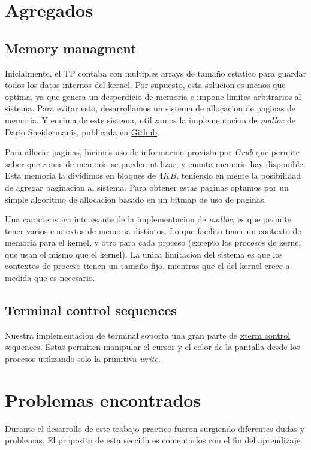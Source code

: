 \documentclass[a4paper,10pt]{article}
\begin{document}
\newpage
\section{Agregados}
\subsection{Memory managment}
Inicialmente, el TP contaba con multiples arrays de tamaño estatico para guardar todos los datos internos del kernel.
Por supuesto, esta solucion es menos que optima, ya que genera un desperdicio de memoria e impone limites arbitrarios al sistema.
Para evitar esto, desarrollamos un sistema de allocacion de paginas de memoria.
Y encima de este sistema, utilizamos la implementacion de \textit{malloc} de Dario Sneidermanis, publicada en \href{https://github.com/esneider/malloc}{Github}.

Para allocar paginas, hicimos uso de informacion provista por \textit{Grub} que permite saber que zonas de memoria se pueden utilizar, y cuanta memoria hay disponible.
Esta memoria la dividimos en bloques de $4KB$, teniendo en mente la posibilidad de agregar paginacion al sistema.
Para obtener estas paginas optamos por un simple algoritmo de allocacion basado en un bitmap de uso de paginas.

Una caracteristica interesante de la implementacion de \textit{malloc}, es que permite tener varios contextos de memoria distintos.
Lo que facilito tener un contexto de memoria para el kernel, y otro para cada proceso (excepto los procesos de kernel que usan el mismo que el kernel).
La unica limitacion del sistema es que los contextos de proceso tienen un tamaño fijo, mientras que el del kernel crece a medida que es necesario.

\subsection{Terminal control sequences}
Nuestra implementacion de terminal soporta una gran parte de \href{http://invisible-island.net/xterm/ctlseqs/ctlseqs.html}{xterm control sequences}.
Estas permiten manipular el cursor y el color de la pantalla desde los procesos utilizando solo la primitiva \textit{write}.

\newpage
\section{Problemas encontrados}

Durante el desarrollo de este trabajo practico fueron surgiendo diferentes dudas y problemas. El proposito de esta
sección es comentarlos con el fin del aprendizaje.
\end{document}
